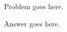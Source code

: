 \documentclass{exercise}
\begin{document}
\makeheader

\begin{problem}
Problem goes here.

\begin{answer}
    Answer goes here.
\end{answer}

\end{problem}
\end{document}
